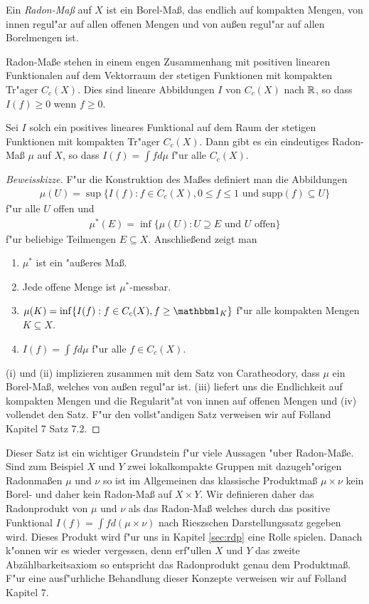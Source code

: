 	\begin{defi}
		Ein \emph{Radon-Maß} auf $X$ ist ein Borel-Maß, das endlich auf kompakten Mengen, von innen regul"ar auf allen offenen Mengen und von außen regul"ar auf allen Borelmengen ist.
	\end{defi}
	Radon-Maße stehen in einem engen Zusammenhang mit positiven linearen Funktionalen auf dem Vektorraum der stetigen Funktionen mit kompakten Tr"ager $C_c(X)$.
	Dies sind lineare Abbildungen $I$ von $C_c(X)$ nach $\mathbb{R}$, so dass $I(f) \geq 0$ wenn $f\geq 0$.
	\begin{satz}
		Sei $I$ solch ein positives lineares Funktional auf dem Raum der stetigen Funktionen mit kompakten Tr"ager $C_c(X)$.
		Dann gibt es ein eindeutiges Radon-Maß $\mu$ auf $X$, so dass $I(f) = \int f d\mu$ f"ur alle $C_c(X)$.
	\end{satz}
	\begin{proof}[Beweisskizze]
		F"ur die Konstruktion des Maßes definiert man die Abbildungen
		\begin{align*}
			\mu(U) = \sup\{I(f): f\in C_c(X), 0\leq f\leq 1 \text{ und } \text{supp}(f) \subseteq U\}
		\end{align*}
		f"ur alle $U$ offen und
		\begin{align*}
			\mu^*(E) = \inf \{ \mu(U): U\supseteq E \text{ und } U \text{ offen}\}
		\end{align*}
		f"ur beliebige Teilmengen $E\subseteq X$. 
		Anschließend zeigt man
		\begin{enumerate}[label=(\roman*)]
			\item $\mu^*$ ist ein "außeres Maß.
			\item Jede offene Menge ist $\mu^*$-messbar.
			\item $\mu(K) = \inf\{I(f): f\in C_c(X), f\geq \ind_K\}$ f"ur alle kompakten Mengen $K \subseteq X$.
			\item $I(f) = \int f d\mu$ f"ur alle $f\in C_c(X)$.
		\end{enumerate}
		(i) und (ii) implizieren zusammen mit dem Satz von Caratheodory, dass $\mu$ ein Borel-Maß, welches von außen regul"ar ist.
		(iii) liefert uns die Endlichkeit auf kompakten Mengen und die Regularit"at von innen auf offenen Mengen und (iv) vollendet den Satz.
		F"ur den vollst"andigen Satz verweisen wir auf Folland \cite{folland} Kapitel 7 Satz 7.2.
	\end{proof}
	Dieser Satz ist ein wichtiger Grundstein f"ur viele Aussagen "uber Radon-Maße.
	Sind zum Beispiel $X$ und $Y$ zwei lokalkompakte Gruppen mit dazugeh"origen Radonmaßen $\mu$ und $\nu$ so ist im Allgemeinen das klassische Produktmaß $\mu \times \nu$ kein Borel- und daher kein Radon-Maß auf $X \times Y$.
	Wir definieren daher das Radonprodukt von $\mu$ und $\nu$ als das Radon-Maß welches durch das positive Funktional $I(f) = \int f d(\mu \times \nu)$ nach Rieszschen Darstellungssatz gegeben wird.
	Dieses Produkt wird f"ur uns in Kapitel \ref{sec:rdp} eine Rolle spielen.
	Danach k"onnen wir es wieder vergessen, denn erf"ullen $X$ und $Y$ das zweite Abzählbarkeitsaxiom so entspricht das Radonprodukt genau dem Produktmaß.
	F"ur eine ausf"urhliche Behandlung dieser Konzepte verweisen wir auf Folland \cite{folland} Kapitel 7.
	
